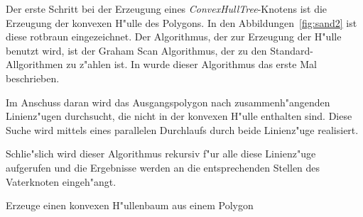 Der erste Schritt bei der Erzeugung eines \textit{ConvexHullTree}-Knotens ist die Erzeugung der konvexen H"ulle des Polygons. In den Abbildungen~\vref{fig:sand2} ist diese rotbraun eingezeichnet. Der Algorithmus, der zur Erzeugung der H"ulle benutzt wird, ist der Graham Scan Algorithmus, der zu den Standard-Allgorithmen zu z"ahlen ist. In \cite{G72} wurde dieser Algorithmus das erste Mal beschrieben.

Im Anschuss daran wird das Ausgangspolygon nach zusammenh"angenden Linienz"ugen durchsucht, die nicht in der konvexen H"ulle enthalten sind. Diese Suche wird mittels eines parallelen Durchlaufs durch beide Linienz"uge realisiert.

Schlie"slich wird dieser Algorithmus rekursiv f"ur alle diese Linienz"uge aufgerufen und die Ergebnisse werden an die entsprechenden Stellen des Vaterknoten eingeh"angt.

\begin{algorithm}[!ht]

	\caption{Erzeuge einen konvexen H"ullenbaum aus einem Polygon}
	\BlankLine
 \end{algorithm}


